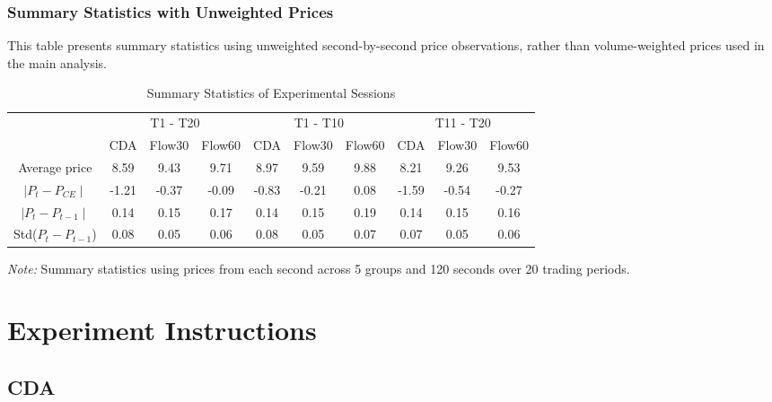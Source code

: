 \documentclass[12pt]{article}
\begin{document}
\begin{singlespace}
\subsubsection{Summary Statistics with Unweighted Prices}

This table presents summary statistics using unweighted second-by-second price observations, rather than volume-weighted prices used in the main analysis.

\begin{table}[H]
    \centering
    \caption{Summary Statistics of Experimental Sessions}
    \begin{threeparttable}
    \begin{tabular}{cccccccccc}
    \toprule
     & \multicolumn{3}{c}{T1 - T20} & \multicolumn{3}{c}{T1 - T10}  & \multicolumn{3}{c}{T11 - T20}  \\
     & CDA          & Flow30          & Flow60          & CDA           & Flow30          & Flow60          & CDA        & Flow30          & Flow60           \\
    \midrule
    Average price & 8.59 & 9.43 & 9.71 & 8.97 & 9.59 & 9.88 & 8.21 & 9.26 & 9.53 \\
    $\mid P_t - P_{CE} \mid$ & -1.21 & -0.37 & -0.09 & -0.83 & -0.21 & 0.08 & -1.59 & -0.54 & -0.27 \\
    $\mid P_{t} - P_{t - 1} \mid$ & 0.14 & 0.15 & 0.17 & 0.14 & 0.15 & 0.19 & 0.14 & 0.15 & 0.16 \\
    Std($P_{t} - P_{t - 1}$) & 0.08 & 0.05 & 0.06 & 0.08 & 0.05 & 0.07 & 0.07 & 0.05 & 0.06 \\
    \bottomrule
    \end{tabular}
    \begin{tablenotes}
    \item \small \textit{Note:} Summary statistics using prices from each second across 5 groups and 120 seconds over 20 trading periods.
    \end{tablenotes}
    \end{threeparttable}
    \label{tab:summary_stat_raw}
\end{table}

\newpage

\section*{Experiment Instructions}
\subsection*{CDA} \label{app_instruction_cda}


\end{singlespace}
\end{document}

